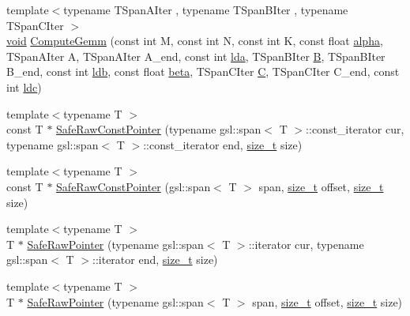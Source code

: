\begin{DoxyCompactItemize}
\item 
{\footnotesize template$<$typename T\+Span\+A\+Iter , typename T\+Span\+B\+Iter , typename T\+Span\+C\+Iter $>$ }\\\mbox{\hyperlink{mlasi_8h_a88f941d423cb2a819b70a1358982b1a6}{void}} \mbox{\hyperlink{namespaceonnxruntime_1_1rnn_1_1detail_a65f176827472830fb9fde7fefb96e623}{Compute\+Gemm}} (const int M, const int N, const int K, const float \mbox{\hyperlink{mlasi_8h_a1763355f32e1812e5cb3a0080e7cca12}{alpha}}, T\+Span\+A\+Iter A, T\+Span\+A\+Iter A\+\_\+end, const int \mbox{\hyperlink{mlasi_8h_a38dd84f17dbd65aaf9f618e5c3ec496f}{lda}}, T\+Span\+B\+Iter \mbox{\hyperlink{mlasi_8h_a472f4360dfbf830e5135980ff43484b9}{B}}, T\+Span\+B\+Iter B\+\_\+end, const int \mbox{\hyperlink{mlasi_8h_a4431ce68ee01016a66896cedd34a57db}{ldb}}, const float \mbox{\hyperlink{mlasi_8h_a5fd37d216981b4cd9a19e29b5acd48d4}{beta}}, T\+Span\+C\+Iter \mbox{\hyperlink{mlasi_8h_a5693f8b3559ce97985de5239fdcf6006}{C}}, T\+Span\+C\+Iter C\+\_\+end, const int \mbox{\hyperlink{mlasi_8h_ab55e28f894e92d01896d7dfc5e3cfa86}{ldc}})
\item 
{\footnotesize template$<$typename T $>$ }\\const T $\ast$ \mbox{\hyperlink{namespaceonnxruntime_1_1rnn_1_1detail_ac6e5fd9766ba90302551cd51d222bc91}{Safe\+Raw\+Const\+Pointer}} (typename gsl\+::span$<$ T $>$\+::const\+\_\+iterator cur, typename gsl\+::span$<$ T $>$\+::const\+\_\+iterator end, \mbox{\hyperlink{mlasi_8h_a503efbc1c6e50825320ad909366b78ab}{size\+\_\+t}} size)
\item 
{\footnotesize template$<$typename T $>$ }\\const T $\ast$ \mbox{\hyperlink{namespaceonnxruntime_1_1rnn_1_1detail_abac03a9f5be0f301681ee7bbfd7ffc8e}{Safe\+Raw\+Const\+Pointer}} (gsl\+::span$<$ T $>$ span, \mbox{\hyperlink{mlasi_8h_a503efbc1c6e50825320ad909366b78ab}{size\+\_\+t}} offset, \mbox{\hyperlink{mlasi_8h_a503efbc1c6e50825320ad909366b78ab}{size\+\_\+t}} size)
\item 
{\footnotesize template$<$typename T $>$ }\\T $\ast$ \mbox{\hyperlink{namespaceonnxruntime_1_1rnn_1_1detail_a7eee4ee52633bb01c2e273ea709ac3e8}{Safe\+Raw\+Pointer}} (typename gsl\+::span$<$ T $>$\+::iterator cur, typename gsl\+::span$<$ T $>$\+::iterator end, \mbox{\hyperlink{mlasi_8h_a503efbc1c6e50825320ad909366b78ab}{size\+\_\+t}} size)
\item 
{\footnotesize template$<$typename T $>$ }\\T $\ast$ \mbox{\hyperlink{namespaceonnxruntime_1_1rnn_1_1detail_ae10eb0035c900f7caf6ed6852532c353}{Safe\+Raw\+Pointer}} (typename gsl\+::span$<$ T $>$ span, \mbox{\hyperlink{mlasi_8h_a503efbc1c6e50825320ad909366b78ab}{size\+\_\+t}} offset, \mbox{\hyperlink{mlasi_8h_a503efbc1c6e50825320ad909366b78ab}{size\+\_\+t}} size)

\end{DoxyCompactItemize}
